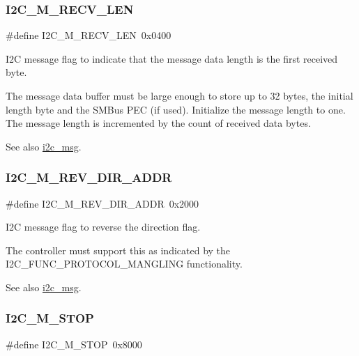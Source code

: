 \subsubsection{\texorpdfstring{I2C\_M\_RECV\_LEN}{I2C\_M\_RECV\_LEN}}
{\footnotesize\ttfamily \#define I2\+C\+\_\+\+M\+\_\+\+R\+E\+C\+V\+\_\+\+L\+EN~0x0400}



I2C message flag to indicate that the message data length is the first received byte. 

The message data buffer must be large enough to store up to 32 bytes, the initial length byte and the S\+M\+Bus P\+EC (if used). Initialize the message length to one. The message length is incremented by the count of received data bytes.

\begin{DoxySeeAlso}{See also}
\mbox{\hyperlink{structi2c__msg}{i2c\+\_\+msg}}. 
\end{DoxySeeAlso}
\mbox{\label{group__I2CLinux_ga6392dd65e4022a3ed20fc2d7dca3392f}} 
\subsubsection{\texorpdfstring{I2C\_M\_REV\_DIR\_ADDR}{I2C\_M\_REV\_DIR\_ADDR}}
{\footnotesize\ttfamily \#define I2\+C\+\_\+\+M\+\_\+\+R\+E\+V\+\_\+\+D\+I\+R\+\_\+\+A\+D\+DR~0x2000}



I2C message flag to reverse the direction flag. 

The controller must support this as indicated by the I2\+C\+\_\+\+F\+U\+N\+C\+\_\+\+P\+R\+O\+T\+O\+C\+O\+L\+\_\+\+M\+A\+N\+G\+L\+I\+NG functionality.

\begin{DoxySeeAlso}{See also}
\mbox{\hyperlink{structi2c__msg}{i2c\+\_\+msg}}. 
\end{DoxySeeAlso}
\mbox{\label{group__I2CLinux_gaf8026e2132312a148edbe7ff4ce52a72}} 
\subsubsection{\texorpdfstring{I2C\_M\_STOP}{I2C\_M\_STOP}}
{\footnotesize\ttfamily \#define I2\+C\+\_\+\+M\+\_\+\+S\+T\+OP~0x8000}




